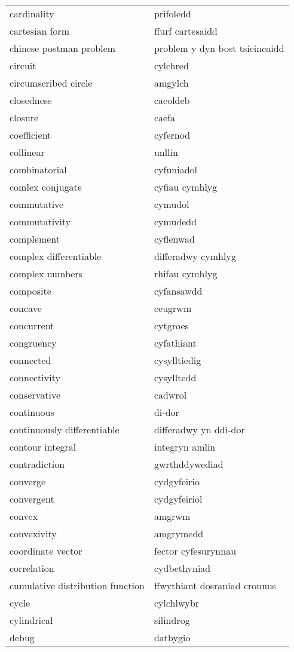 \begin{supertabular}{p{0.22\textwidth}p{0.22\textwidth}}
cardinality & prifoledd \\
cartesian form & ffurf cartesaidd \\
chinese postman problem & problem y dyn bost tsieineaidd \\
circuit & cylchred \\
circumscribed circle & amgylch \\
closedness & caeoldeb \\
closure & caefa \\
coefficient & cyfernod \\
collinear & unllin \\
combinatorial & cyfuniadol \\
comlex conjugate & cyfiau cymhlyg \\
commutative & cymudol \\
commutativity & cymudedd \\
complement & cyflenwad \\
complex differentiable & differadwy cymhlyg \\
complex numbers & rhifau cymhlyg \\
composite & cyfansawdd \\
concave & ceugrwm \\
concurrent & cytgroes \\
congruency & cyfathiant \\
connected & cysylltiedig \\
connectivity & cysylltedd \\
conservative & cadwrol \\
continuous & di-dor \\
continuously differentiable & differadwy yn ddi-dor \\
contour integral & integryn amlin \\
contradiction & gwrthddywediad \\
converge & cydgyfeirio \\
convergent & cydgyfeiriol \\
convex & amgrwm \\
convexivity & amgrymedd \\
coordinate vector & fector cyfesurynnau \\
correlation & cydbethyniad \\
cumulative distribution function & ffwythiant dosraniad cronnus \\
cycle & cylchlwybr \\
cylindrical & silindrog \\
debug & datbygio \\

\end{supertabular}
